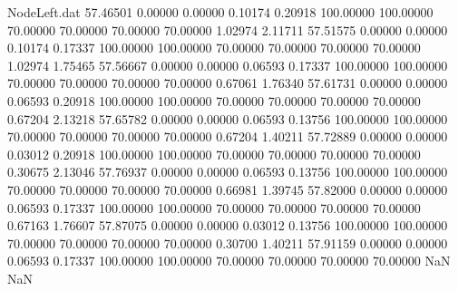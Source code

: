 \begin{filecontents}{NodeLeft.dat}
  57.46501    0.00000    0.00000     0.10174    0.20918  100.00000  100.00000   70.00000   70.00000   70.00000   70.00000    1.02974    2.11711
  57.51575    0.00000    0.00000     0.10174    0.17337  100.00000  100.00000   70.00000   70.00000   70.00000   70.00000    1.02974    1.75465
  57.56667    0.00000    0.00000     0.06593    0.17337  100.00000  100.00000   70.00000   70.00000   70.00000   70.00000    0.67061    1.76340
  57.61731    0.00000    0.00000     0.06593    0.20918  100.00000  100.00000   70.00000   70.00000   70.00000   70.00000    0.67204    2.13218
  57.65782    0.00000    0.00000     0.06593    0.13756  100.00000  100.00000   70.00000   70.00000   70.00000   70.00000    0.67204    1.40211
  57.72889    0.00000    0.00000     0.03012    0.20918  100.00000  100.00000   70.00000   70.00000   70.00000   70.00000    0.30675    2.13046
  57.76937    0.00000    0.00000     0.06593    0.13756  100.00000  100.00000   70.00000   70.00000   70.00000   70.00000    0.66981    1.39745
  57.82000    0.00000    0.00000     0.06593    0.17337  100.00000  100.00000   70.00000   70.00000   70.00000   70.00000    0.67163    1.76607
  57.87075    0.00000    0.00000     0.03012    0.13756  100.00000  100.00000   70.00000   70.00000   70.00000   70.00000    0.30700    1.40211
  57.91159    0.00000    0.00000     0.06593    0.17337  100.00000  100.00000   70.00000   70.00000   70.00000   70.00000        NaN        NaN
\end{filecontents}
